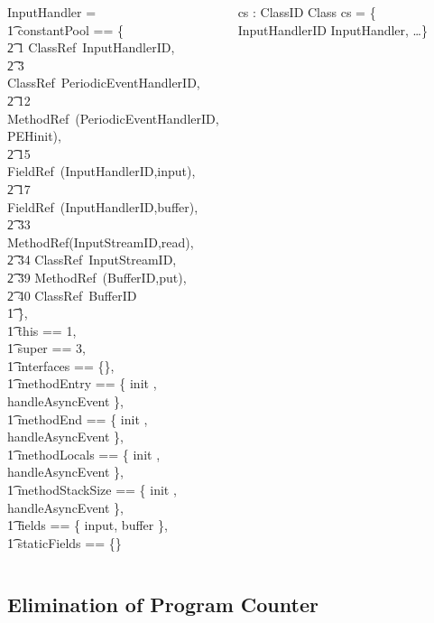 \documentclass{beamer}
\begin{document}
\begin{frame}
\begin{columns}[T]
\begin{axdef}
    \where
      InputHandler = \lblot \\
      \t1 constantPool == \{ \\
      \t2 1 \mapsto ClassRef~InputHandlerID, \\
      \t2 3 \mapsto ClassRef~PeriodicEventHandlerID, \\
      \t2 12 \mapsto MethodRef~(PeriodicEventHandlerID, PEHinit), \\
      \t2 15 \mapsto FieldRef~(InputHandlerID,input), \\
      \t2 17 \mapsto FieldRef~(InputHandlerID,buffer), \\
      \t2 33 \mapsto MethodRef(InputStreamID,read), \\
      \t2 34 \mapsto ClassRef~InputStreamID, \\
      \t2 39 \mapsto MethodRef~(BufferID,put), \\
      \t2 40 \mapsto ClassRef~BufferID \\
      \t1 \}, \\
      \t1 this == 1, \\
      \t1 super == 3, \\
      \t1 interfaces == \{\}, \\
      \t1 methodEntry == \{ init , handleAsyncEvent  \}, \\
      \t1 methodEnd == \{ init , handleAsyncEvent  \}, \\
      \t1 methodLocals == \{ init , handleAsyncEvent  \}, \\
      \t1 methodStackSize == \{ init , handleAsyncEvent  \}, \\
      \t1 fields == \{ input, buffer \}, \\
      \t1 staticFields == \{\} \\
      \rblot
    \end{axdef}
    
    \begin{axdef}
      cs : ClassID \pfun Class
    \where
      cs = \{ InputHandlerID \mapsto InputHandler, \dots \}
    \end{axdef}
  \end{columns}
\end{frame}

\subsection{Elimination of Program Counter}
\end{document}
